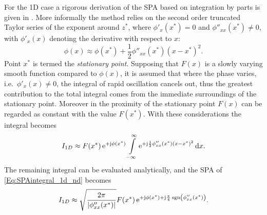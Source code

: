 For the 1D case a rigorous derivation of the SPA based on integration by parts is given in \cite{Bleistein1984, Blenstein1975, Williams1999}.
More informally the method relies on the second order truncated Taylor series of the exponent around $z^*$, where $\phi'_x(x^*) = 0$ and $\phi''_{xx}(x^*) \neq 0$, with $\phi'_x(x)$ denoting the derivative with respect to $x$:
\begin{equation}
\phi(x) \approx \phi(x^*) + \frac{1}{2}\phi''_{xx}(x^*)(x-x^*)^2.
\end{equation}
Point $x^*$ is termed the \emph{stationary point}.
%
Supposing that $F(x)$ is a slowly varying smooth function compared to $\phi(x)$, it is assumed that where the phase varies, i.e.\ $\phi'_x(x) \neq 0$, the integral of rapid oscillation cancels out, thus the greatest contribution to the total integral comes from the immediate surroundings of the stationary point.
Moreover in the proximity of the stationary point $F(x)$ can be regarded as constant with the value $F(x^*)$.
%
With these considerations the integral becomes
\begin{align}
I_{1D} \approx F(x^*)\,\mathrm{e}^{+\mathrm{j}\phi(x^*)} 
\int\limits_{-\infty}^{\infty} \mathrm{e}^{+\mathrm{j} \frac{1}{2}\phi''_{xx}(x^*)(x-x^*)^2} \, \mathrm{d} x.
\end{align}
The remaining integral can be evaluated analytically, and the SPA of \eqref{Eq:SPAintegral_1d_nd} becomes \cite[Ch.\ 2.8]{Blenstein1975}
\begin{equation}
\label{Eq:SPAResult}
I_{1D} \approx \sqrt{\frac{2\pi}{| \phi''_{xx}(x^*) |}} F(x^*) \, \mathrm{e}^{+\mathrm{j} \phi(x^*) + \mathrm{j} \frac{\pi}{4}\,\mathrm{sgn}\left(  \phi''_{xx}(x^*) \right)}.
\end{equation}

